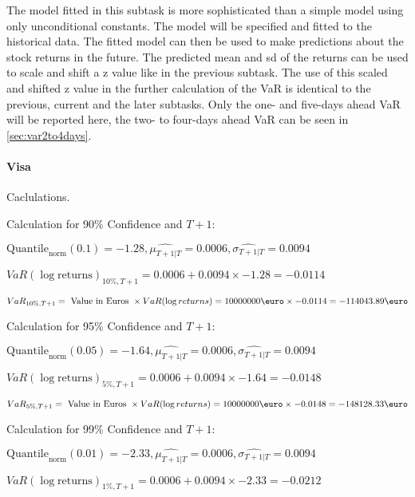 The model fitted in this subtask is more sophisticated than a simple model using only unconditional constants. 
The model will be specified and fitted to the historical data. The fitted model can then be used to make predictions about the stock returns in the future. The predicted mean and sd of the returns can be used to scale and shift a z value like in the previous subtask.
The use of this scaled and shifted z value in the further calculation of the VaR is identical to the previous, current and the later subtasks.
Only the one- and five-days ahead VaR will be reported here, the two- to four-days ahead VaR can be seen in \ref{sec:var2to4days}.
\paragraph{Visa} Caclulations.\newline \indent 




Calculation for 90\% Confidence and $T+1$:

\indent\indent $\text{Quantile}_\text{norm}(0.1) = -1.28,\hat{\mu_{T+1|T}} = 0.0006, \hat{\sigma_{T+1|T}} = 0.0094$

\indent\indent $VaR(\log \text{returns})_{10\%, T + 1} = 0.0006 + 0.0094\times-1.28 = -0.0114$

\indent\indent $VaR_{10\%, T + 1} = \text{ Value in Euros } \times VaR(\log returns) = 10 000 000 \text{\euro} \times-0.0114 = -114043.89 \text{\euro}$\newline




Calculation for 95\% Confidence and $T+1$:

\indent\indent $\text{Quantile}_\text{norm}(0.05) = -1.64,\hat{\mu_{T+1|T}} = 0.0006, \hat{\sigma_{T+1|T}} = 0.0094$

\indent\indent $VaR(\log \text{returns})_{5\%, T + 1} = 0.0006 + 0.0094\times-1.64 = -0.0148$

\indent\indent $VaR_{5\%, T + 1} = \text{ Value in Euros } \times VaR(\log returns) = 10 000 000 \text{\euro} \times-0.0148 = -148128.33 \text{\euro}$\newline




Calculation for 99\% Confidence and $T+1$:

\indent\indent $\text{Quantile}_\text{norm}(0.01) = -2.33,\hat{\mu_{T+1|T}} = 0.0006, \hat{\sigma_{T+1|T}} = 0.0094$

\indent\indent $VaR(\log \text{returns})_{1\%, T + 1} = 0.0006 + 0.0094\times-2.33 = -0.0212$

